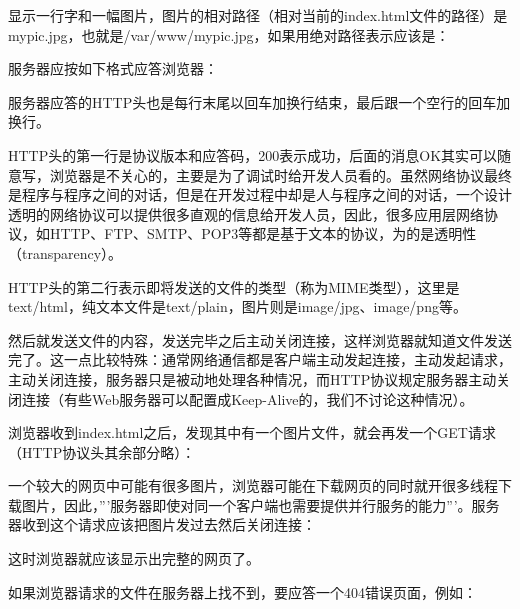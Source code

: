 

显示一行字和一幅图片，图片的相对路径（相对当前的index.\BookSplit{}html文件的路径）是mypic.\BookSplit{}jpg，也就是/var/\BookSplit{}www/\BookSplit{}mypic.\BookSplit{}jpg，如果用绝对路径表示应该是：




服务器应按如下格式应答浏览器：




服务器应答的HTTP头也是每行末尾以回车加换行结束，最后跟一个空行的回车加换行。



HTTP头的第一行是协议版本和应答码，200表示成功，后面的消息OK其实可以随意写，浏览器是不关心的，主要是为了调试时给开发人员看的。虽然网络协议最终是程序与程序之间的对话，但是在开发过程中却是人与程序之间的对话，一个设计透明的网络协议可以提供很多直观的信息给开发人员，因此，很多应用层网络协议，如HTTP、FTP、SMTP、POP3等都是基于文本的协议，为的是透明性（transparency）。



HTTP头的第二行表示即将发送的文件的类型（称为MIME类型），这里是text/\BookSplit{}html，纯文本文件是text/\BookSplit{}plain，图片则是image/\BookSplit{}jpg、image/\BookSplit{}png等。



然后就发送文件的内容，发送完毕之后主动关闭连接，这样浏览器就知道文件发送完了。这一点比较特殊：通常网络通信都是客户端主动发起连接，主动发起请求，主动关闭连接，服务器只是被动地处理各种情况，而HTTP协议规定服务器主动关闭连接（有些Web服务器可以配置成Keep-Alive的，我们不讨论这种情况）。



浏览器收到index.\BookSplit{}html之后，发现其中有一个图片文件，就会再发一个GET请求（HTTP协议头其余部分略）：




一个较大的网页中可能有很多图片，浏览器可能在下载网页的同时就开很多线程下载图片，因此，'''服务器即使对同一个客户端也需要提供并行服务的能力'''。服务器收到这个请求应该把图片发过去然后关闭连接：




这时浏览器就应该显示出完整的网页了。



如果浏览器请求的文件在服务器上找不到，要应答一个404错误页面，例如：



